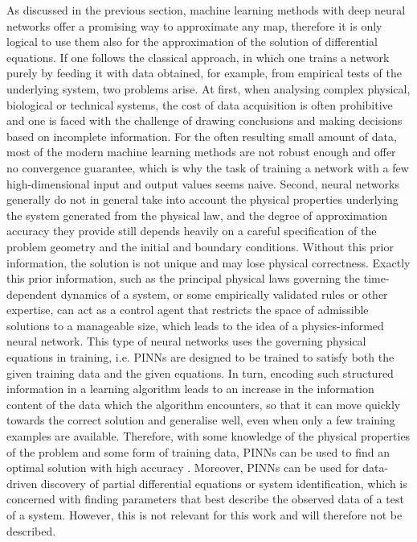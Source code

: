 As discussed in the previous section, machine learning methods with deep neural networks offer a promising way to approximate any map, therefore it is only logical to use them also for the approximation of the solution of differential equations. If one follows the classical approach, in which one trains a network purely by feeding it with data obtained, for example, from empirical tests of the underlying system, two problems arise. At first, when analysing complex physical, biological or technical systems, the cost of data acquisition is often prohibitive and one is faced with the challenge of drawing conclusions and making decisions based on incomplete information. For the often resulting small amount of data, most of the modern machine learning methods are not robust enough and offer no convergence guarantee, which is why the task of training a network with a few high-dimensional input and output values seems naive. Second, neural networks generally do not in general take into account the physical properties underlying the system generated from the physical law, and the degree of approximation accuracy they provide still depends heavily on a careful specification of the problem geometry and the initial and boundary conditions. Without this prior information, the solution is not unique and may lose physical correctness. Exactly this prior information, such as the principal physical laws governing the time-dependent dynamics of a system, or some empirically validated rules or other expertise, can act as a control agent that restricts the space of admissible solutions to a manageable size, which leads to the idea of a physics-informed neural network. This type of neural networks uses the governing physical equations in training, i.e. PINNs are designed to be trained to satisfy both the given training data and the given equations. In turn, encoding such structured information in a learning algorithm leads to an increase in the information content of the data which the algorithm encounters, so that it can move quickly towards the correct solution and generalise well, even when only a few training examples are available. Therefore, with some knowledge of the physical properties of the problem and some form of training data, PINNs can be used to find an optimal solution with high accuracy \cite{RaissiPerdikarisKarniadakisPart1:2017}. Moreover, PINNs can be used for data-driven discovery of partial differential equations or system identification, which is concerned with finding parameters that best describe the observed data of a test of a system. However, this is not relevant for this work and will therefore not be described. \\



